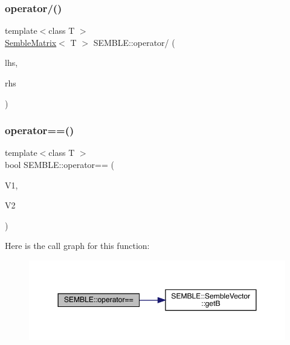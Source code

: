 \subsubsection{\texorpdfstring{operator/()}{operator/()}\hspace{0.1cm}{\footnotesize\ttfamily [6/6]}}
{\footnotesize\ttfamily template$<$class T $>$ \\
\mbox{\hyperlink{structSEMBLE_1_1SembleMatrix}{Semble\+Matrix}}$<$ T $>$ S\+E\+M\+B\+L\+E\+::operator/ (\begin{DoxyParamCaption}\item[{const \mbox{\hyperlink{structSEMBLE_1_1SembleMatrix}{Semble\+Matrix}}$<$ T $>$ \&}]{lhs,  }\item[{const typename \mbox{\hyperlink{structSEMBLE_1_1PromoteEnsem}{Promote\+Ensem}}$<$ T $>$\+::Type \&}]{rhs }\end{DoxyParamCaption})}

\mbox{\label{namespaceSEMBLE_a65452741b42f7d53a7a529b23b871ccb}} 
\subsubsection{\texorpdfstring{operator==()}{operator==()}\hspace{0.1cm}{\footnotesize\ttfamily [1/2]}}
{\footnotesize\ttfamily template$<$class T $>$ \\
bool S\+E\+M\+B\+L\+E\+::operator== (\begin{DoxyParamCaption}\item[{const \mbox{\hyperlink{structSEMBLE_1_1SembleVector}{Semble\+Vector}}$<$ T $>$ \&}]{V1,  }\item[{const \mbox{\hyperlink{structSEMBLE_1_1SembleVector}{Semble\+Vector}}$<$ T $>$ \&}]{V2 }\end{DoxyParamCaption})}

Here is the call graph for this function\+:
\nopagebreak
\begin{figure}[H]
\begin{center}
\leavevmode
\includegraphics[width=350pt]{d7/dfd/namespaceSEMBLE_a65452741b42f7d53a7a529b23b871ccb_cgraph}
\end{center}
\end{figure}
\mbox{\label{namespaceSEMBLE_a04e3d846fff45a4b9a5b72b722bc949e}} 
